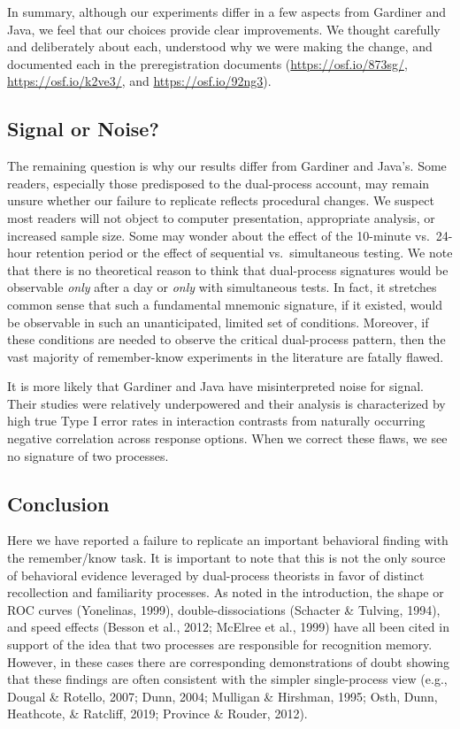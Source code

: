 \documentclass[english,,man,floatsintext]{apa6}
\begin{document}
In summary, although our experiments differ in a few aspects from Gardiner and Java, we feel that our choices provide clear improvements. We thought carefully and deliberately about each, understood why we were making the change, and documented each in the preregistration documents (\url{https://osf.io/873sg/}, \url{https://osf.io/k2ve3/}, and \url{https://osf.io/92ng3}).

\hypertarget{signal-or-noise}{%
\subsection{Signal or Noise?}\label{signal-or-noise}}

The remaining question is why our results differ from Gardiner and Java's. Some readers, especially those predisposed to the dual-process account, may remain unsure whether our failure to replicate reflects procedural changes. We suspect most readers will not object to computer presentation, appropriate analysis, or increased sample size. Some may wonder about the effect of the 10-minute vs.~24-hour retention period or the effect of sequential vs.~simultaneous testing. We note that there is no theoretical reason to think that dual-process signatures would be observable \emph{only} after a day or \emph{only} with simultaneous tests. In fact, it stretches common sense that such a fundamental mnemonic signature, if it existed, would be observable in such an unanticipated, limited set of conditions. Moreover, if these conditions are needed to observe the critical dual-process pattern, then the vast majority of remember-know experiments in the literature are fatally flawed.

It is more likely that Gardiner and Java have misinterpreted noise for signal. Their studies were relatively underpowered and their analysis is characterized by high true Type I error rates in interaction contrasts from naturally occurring negative correlation across response options. When we correct these flaws, we see no signature of two processes.

\hypertarget{conclusion}{%
\subsection{Conclusion}\label{conclusion}}

Here we have reported a failure to replicate an important behavioral finding with the remember/know task. It is important to note that this is not the only source of behavioral evidence leveraged by dual-process theorists in favor of distinct recollection and familiarity processes. As noted in the introduction, the shape or ROC curves (Yonelinas, 1999), double-dissociations (Schacter \& Tulving, 1994), and speed effects (Besson et al., 2012; McElree et al., 1999)
have all been cited in support of the idea that two processes are responsible for recognition memory. However, in these cases there are corresponding demonstrations of doubt showing that these findings are often consistent with the simpler single-process view (e.g., Dougal \& Rotello, 2007; Dunn, 2004; Mulligan \& Hirshman, 1995; Osth, Dunn, Heathcote, \& Ratcliff, 2019; Province \& Rouder, 2012).
\end{document}
